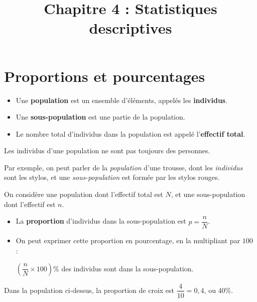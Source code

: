 \documentclass[
	classe=$2^{de}$
]{coursclass}
\title{Chapitre 4 : Statistiques descriptives}
\author{}
\date{}
\begin{document}
\maketitle

\section{Proportions et pourcentages}

\begin{definition}[Population]
	\begin{itemize}
		\item Une \textbf{population} est un ensemble d'éléments, appelés les \textbf{individus}.
		\item Une \textbf{sous-population} est une partie de la population.
		\item Le nombre total d'individus dans la population est appelé l'\textbf{effectif total}.
	\end{itemize}
\end{definition}

\begin{remarque}
	Les individus d'une population ne sont pas toujours des personnes.

	Par exemple, on peut parler de la \textit{population} d'une trousse, dont les \textit{individus} sont les stylos, et une \textit{sous-population} est formée par les stylos rouges.
\end{remarque}

\begin{definition}[Proportion]
	On considère une population dont l'effectif total est $N$, et une sous-population dont l'effectif est $n$.
	\begin{itemize}
		\item La \textbf{proportion} d'individus dans la sous-population est $p = \dfrac{n}{N}$.
		\item On peut exprimer cette proportion en pourcentage, en la multipliant par $100$ :

		      $\left(\dfrac{n}{N}×100\right) \%$ des individus sont dans la sous-population.
	\end{itemize}
\end{definition}

\begin{exemple}
	\begin{center}
	\end{center}
	Dans la population ci-dessus, la proportion de croix est $\dfrac{4}{10} = 0,4$, ou $40\%$.
\end{exemple}
\end{document}
